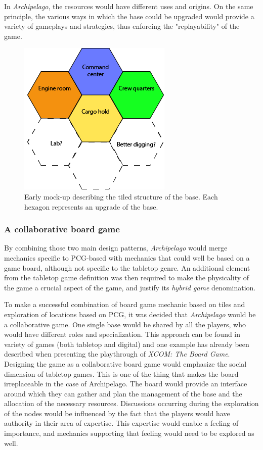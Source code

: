 In \textit{Archipelago}, the resources would have different uses and origins. On the same principle, the various ways in which the base could be upgraded would provide a variety of gameplays and strategies, thus enforcing the "replayability" of the game.

\begin{figure}[h]
    \centering
    \includegraphics[scale=0.5]{Images/Base.png}
    \caption{Early mock-up describing the tiled structure of the base. Each hexagon represents an upgrade of the base.}
    \label{fig:base}
\end{figure}
\subsubsection{A collaborative board game}
By combining those two main design patterns, \textit{Archipelago} would merge mechanics specific to PCG-based with mechanics that could well be based on a game board, although not specific to the tabletop genre. An additional element from the tabletop game definition was then required to make the physicality of the game a crucial aspect of the game, and justify its \textit{hybrid game} denomination.

To make a successful combination of board game mechanic based on tiles and exploration of locations based on PCG, it was decided that \textit{Archipelago} would be a collaborative game. One single base would be shared by all the players, who would have different roles and specialization. This approach can be found in variety of games (both tabletop and digital) and one example has already been described when presenting the playthrough of \textit{XCOM: The Board Game}. Designing the game as a collaborative board game would emphasize the social dimension of tabletop games. This is one of the thing that makes the board irreplaceable in the case of Archipelago. The board would provide an interface around which they can gather and plan the management of the base and the allocation of the necessary resources. Discussions occurring during the exploration of the nodes would be influenced by the fact that the players would have authority in their area of expertise. This expertise would enable a feeling of importance, and mechanics supporting that feeling would need to be explored as well.

